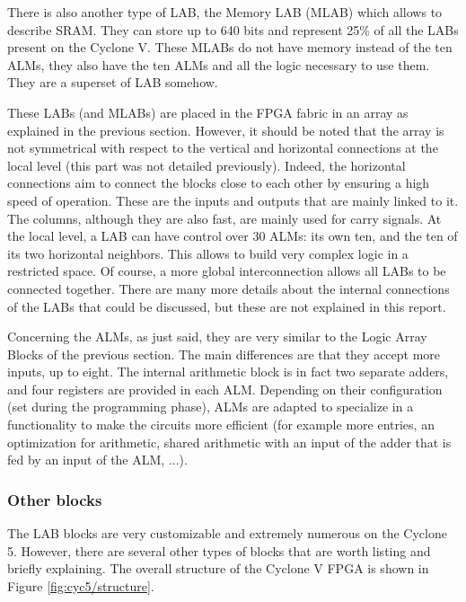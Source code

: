 There is also another type of LAB, the Memory LAB (MLAB) which allows to describe SRAM. They can 
store up to 640 bits and represent 25\% of all the LABs present on the Cyclone V. These MLABs do not 
have memory instead of
the ten ALMs, they also have the ten ALMs and all the logic necessary 
to use them. They are a superset of LAB somehow.

These LABs (and MLABs) are placed in the FPGA fabric in an array as explained in the previous 
section. However, it should be noted that the array is not symmetrical with respect 
to the vertical and horizontal connections at the local level (this part was not detailed 
previously). Indeed, the horizontal connections aim to connect the blocks close to each other by 
ensuring a high speed of operation. These are the inputs and outputs that are mainly linked to it. 
The columns, although they are also fast, are mainly used for carry signals. At the local level, a 
LAB can have control over 30 ALMs: its own ten, and the ten of its two horizontal neighbors. This
allows to build very complex logic in a restricted space. Of course, a more global interconnection 
allows all LABs to be connected together. There are many more details about the internal 
connections of the LABs that could be discussed, but these are not explained in this report.

Concerning the ALMs, as just said, they are very similar to the Logic Array Blocks of 
the previous section. The main differences are that they accept more inputs, up to eight. The 
internal arithmetic block is in fact two separate adders, and four registers are provided in each ALM. 
Depending on their configuration (set during the programming phase), ALMs are adapted to 
specialize in a functionality to make the circuits more efficient (for example more entries, an 
optimization for arithmetic, shared arithmetic with an input of the adder that is fed by an input 
of the ALM, ...). 

\subsubsection*{Other blocks}

The LAB blocks are very customizable and extremely numerous on the Cyclone 5. However, there are 
several other types of blocks that are worth listing and briefly explaining. The overall structure 
of the Cyclone V FPGA is shown in Figure \ref{fig:cyc5/structure}.

